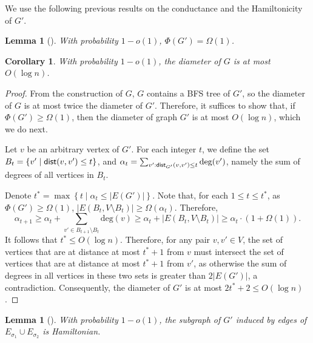 \documentclass[11pt]{article}
\newtheorem{corollary}[theorem]{Corollary}
\newtheorem{lemma}[theorem]{Lemma}
\theoremstyle{definition}
\newcommand{\set}[1]{\left\{ #1 \right\}}
\newcommand{\dist}{\textnormal{\textsf{dist}}}
\def\deg{\textrm{deg}}
\newcounter{note}
\begin{document}

We use the following previous results on the conductance and the Hamiltonicity of $G'$.

\begin{lemma} [\cite{puder2015expansion}] \label{lem:expansion}
    With probability $1-o(1)$, $\Phi(G') = \Omega(1)$.
\end{lemma}

\begin{corollary}
\label{cor: diam}
With probability $1-o(1)$, the diameter of $G$ is at most $O(\log n)$.
\end{corollary}
\begin{proof}
From the construction of $G$, $G$ contains a BFS tree of $G'$, so the diameter of $G$ is at most twice the diameter of $G'$. Therefore, it suffices to show that, if $\Phi(G') \ge \Omega(1)$, then the diameter of graph $G'$ is at most $O(\log n)$, which we do next.

Let $v$ be an arbitrary vertex of $G'$. For each integer $t$, we define the set $B_t=\set{v'\mid \dist(v,v')\le t}$, and $\alpha_t=\sum_{v': \dist_{G'}(v,v')\le t}\deg(v')$, namely  the sum of degrees of all vertices in $B_t$. 

Denote $t^*=\max\set{t\mid \alpha_t\le |E(G')|}$.
Note that, for each $1\le t\le t^*$, as $\Phi(G') \ge \Omega(1)$,
$|E(B_t,V\setminus B_t)|\ge \Omega(\alpha_t)$. Therefore, \[\alpha_{t+1}\ge \alpha_t+\sum_{v'\in B_{t+1}\setminus B_{t}}\deg(v)\ge \alpha_t+ |E(B_t,V\setminus B_t)|\ge \alpha_t\cdot (1+\Omega(1)).\]
It follows that $t^*\le O(\log n)$. Therefore, for any pair $v,v'\in V$, the set of vertices that are at distance at most $t^*+1$ from $v$ must intersect the set of vertices that are at distance at most $t^*+1$ from $v'$, as otherwise the sum of degrees in all vertices in these two sets is greater than $2|E(G')|$, a contradiction. Consequently, the diameter of $G'$ is at most $2t^*+2\le O(\log n)$.
\end{proof}


\begin{lemma} [\cite{frieze2001hamilton}] \label{lem:cycle}
With probability $1-o(1)$, the subgraph of $G'$ induced by edges of $E_{\sigma_1}\cup E_{\sigma_2}$ is Hamiltonian. 
\end{lemma}

\end{document}
